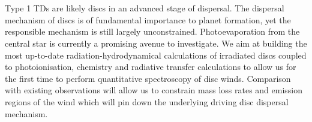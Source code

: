  \\

\\
Type 1 TDs are likely discs in an advanced stage of dispersal. The
dispersal mechanism of discs is of fundamental importance to planet
formation, yet the responsible mechanism is still largely
unconstrained. Photoevaporation from the central star is currently a
promising avenue to investigate. We aim at building the most
up-to-date radiation-hydrodynamical calculations of irradiated discs
coupled to photoionisation, chemistry and radiative transfer
calculations to allow us for the first time to perform quantitative
spectroscopy of disc winds. Comparison with existing observations will
allow us to constrain mass loss rates and emission regions of the wind
which will pin down the underlying driving disc dispersal mechanism.

\vspace{0.5em}


